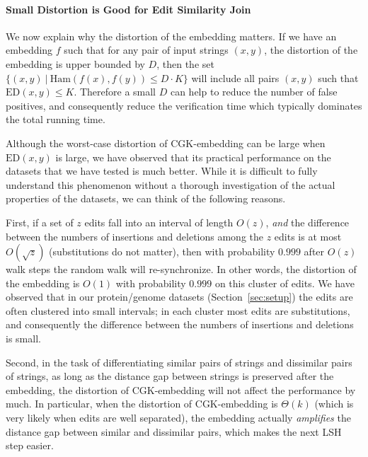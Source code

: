 
\paragraph{Small Distortion is Good for Edit Similarity Join}  We now explain why the distortion of the embedding matters. If we have an embedding $f$ such that for any pair of input strings $(x, y)$, the distortion of the embedding is upper bounded by $D$, then the set $\{(x, y)\ |\ \text{Ham}(f(x), f(y)) \le D \cdot K\}$ will include all pairs $(x, y)$ such that $\text{ED}(x, y) \le K$.  Therefore a small $D$ can help to reduce the number of false positives, and consequently reduce the verification time which typically dominates the total running time.

\medskip

Although the worst-case distortion of CGK-embedding can be large when $\text{ED}(x, y)$ is large, we have observed that its practical performance on the datasets that we have tested is much better.  While it is difficult to fully understand this phenomenon without a thorough investigation of the actual properties of the datasets, we can think of the following reasons.

First, if a set of $z$ edits fall into an interval of length $O(z)$, {\em and} the difference between the numbers of insertions and deletions among the $z$ edits is at most $O(\sqrt{z})$ (substitutions do not matter), then with probability $0.999$ after $O(z)$ walk steps the random walk will re-synchronize.  In other words, the distortion of the embedding is $O(1)$ with probability $0.999$ on this cluster of edits.  We have observed that in our protein/genome datasets (Section~\ref{sec:setup}) the edits are often clustered into small intervals; in each cluster most edits are substitutions, and consequently the difference between the numbers of insertions and deletions is small. 

Second, in the task of differentiating similar pairs of strings and dissimilar pairs of strings, as long as the distance gap between strings is preserved after the embedding, the distortion of CGK-embedding will not affect the performance by much. In particular, when the distortion of CGK-embedding is $\Theta(k)$ (which is very likely when edits are well separated), the embedding actually {\em amplifies} the distance gap between similar and dissimilar pairs, which makes the next LSH step easier.

